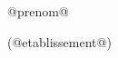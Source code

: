 \begin{block}
\begin{minipage}{0.5\linewidth}
\begin{center}
@prenom@

(@etablissement@)
\end{center}
\end{minipage}



\end{block}

\vfill


\vfill

